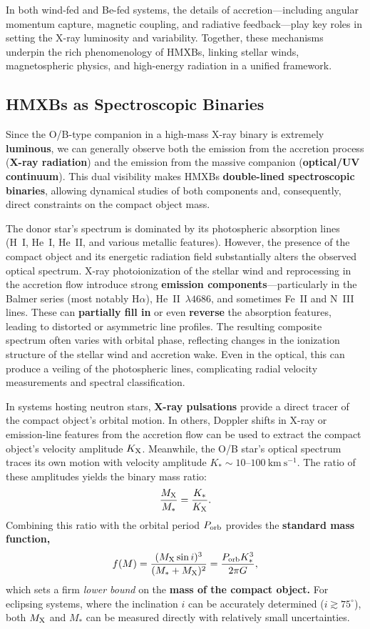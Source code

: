 \par
In both wind-fed and Be-fed systems, the details of accretion---including angular momentum capture, magnetic coupling, and radiative feedback---play key roles in setting the X-ray luminosity and variability. Together, these mechanisms underpin the rich phenomenology of HMXBs, linking stellar winds, magnetospheric physics, and high-energy radiation in a unified framework.

\subsection{HMXBs as Spectroscopic Binaries}

Since the O/B-type companion in a high-mass X-ray binary is extremely \textbf{luminous}, we can generally observe both the emission from the accretion process (\textbf{X-ray radiation}) and the emission from the massive companion (\textbf{optical/UV continuum}). This dual visibility makes HMXBs \textbf{double-lined spectroscopic binaries}, allowing dynamical studies of both components and, consequently, direct constraints on the compact object mass.

\par
The donor star’s spectrum is dominated by its photospheric absorption lines (H~I, He~I, He~II, and various metallic features). However, the presence of the compact object and its energetic radiation field substantially alters the observed optical spectrum. X-ray photoionization of the stellar wind and reprocessing in the accretion flow introduce strong \textbf{emission components}---particularly in the Balmer series (most notably H$\alpha$), He~II~$\lambda4686$, and sometimes Fe~II and N~III lines. These can \textbf{partially fill in} or even \textbf{reverse} the absorption features, leading to distorted or asymmetric line profiles. The resulting composite spectrum often varies with orbital phase, reflecting changes in the ionization structure of the stellar wind and accretion wake. Even in the optical, this can produce a veiling of the photospheric lines, complicating radial velocity measurements and spectral classification.

\par
In systems hosting neutron stars, \textbf{X-ray pulsations} provide a direct tracer of the compact object’s orbital motion. In others, Doppler shifts in X-ray or emission-line features from the accretion flow can be used to extract the compact object’s velocity amplitude $K_{\rm X}$. Meanwhile, the O/B star’s optical spectrum traces its own motion with velocity amplitude $K_\ast \sim 10$--$100~\mathrm{km~s^{-1}}$. The ratio of these amplitudes yields the binary mass ratio:
\[
\frac{M_{\rm X}}{M_\ast} = \frac{K_\ast}{K_{\rm X}}.
\]
Combining this ratio with the orbital period $P_{\rm orb}$ provides the \textbf{standard mass function,}
\[
f(M) = \frac{(M_{\rm X} \sin i)^3}{(M_\ast + M_{\rm X})^2}
= \frac{P_{\rm orb} K_\ast^3}{2\pi G},
\]
which sets a firm \emph{lower bound} on the \textbf{mass of the compact object.} For eclipsing systems, where the inclination $i$ can be accurately determined ($i \gtrsim 75^\circ$), both $M_{\rm X}$ and $M_\ast$ can be measured directly with relatively small uncertainties.

